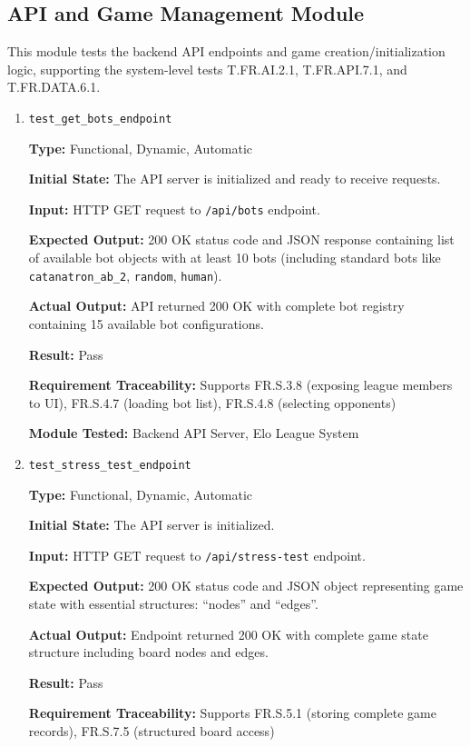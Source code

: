 \documentclass[12pt, titlepage]{article}
\begin{document}
\subsection{API and Game Management Module}

This module tests the backend API endpoints and game creation/initialization logic, supporting the system-level tests T.FR.AI.2.1, T.FR.API.7.1, and T.FR.DATA.6.1.

\begin{enumerate}

\item \texttt{test\_get\_bots\_endpoint}

\textbf{Type:} Functional, Dynamic, Automatic

\textbf{Initial State:} The API server is initialized and ready to receive requests.

\textbf{Input:} HTTP GET request to \texttt{/api/bots} endpoint.

\textbf{Expected Output:} 200 OK status code and JSON response containing list of available bot objects with at least 10 bots (including standard bots like \texttt{catanatron\_ab\_2}, \texttt{random}, \texttt{human}).

\textbf{Actual Output:} API returned 200 OK with complete bot registry containing 15 available bot configurations.

\textbf{Result:} Pass

\textbf{Requirement Traceability:} Supports FR.S.3.8 (exposing league members to UI), FR.S.4.7 (loading bot list), FR.S.4.8 (selecting opponents)

\textbf{Module Tested:} Backend API Server, Elo League System


\item \texttt{test\_stress\_test\_endpoint}

\textbf{Type:} Functional, Dynamic, Automatic

\textbf{Initial State:} The API server is initialized.

\textbf{Input:} HTTP GET request to \texttt{/api/stress-test} endpoint.

\textbf{Expected Output:} 200 OK status code and JSON object representing game state with essential structures: ``nodes'' and ``edges''.

\textbf{Actual Output:} Endpoint returned 200 OK with complete game state structure including board nodes and edges.

\textbf{Result:} Pass

\textbf{Requirement Traceability:} Supports FR.S.5.1 (storing complete game records), FR.S.7.5 (structured board access)


\end{enumerate}
\end{document}
